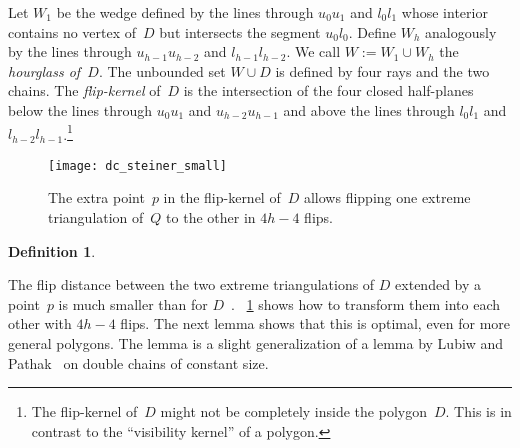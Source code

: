 \documentclass[a4paper,11pt]{article}
\newtheorem{definition}[theorem]{Definition}
\begin{document}
Let $W_1$ be the wedge defined by the lines through $u_0 u_1$ and
$l_0 l_1$ whose interior contains no vertex of~$D$ but intersects the segment $u_0 l_0$.
Define $W_h$ analogously by the lines through $u_{h-1} u_{h-2}$ and $l_{h-1} l_{h-2}$.
We call $W := W_1 \cup W_h$ the \emph{hourglass of~$D$}.
The unbounded set $W \cup D$ is defined by four rays and the two chains.
The \emph{flip-kernel} of~$D$ is the intersection of the four closed half-planes below the lines through $u_0 u_1$ and $u_{h-2} u_{h-1}$ and above the lines through $l_0 l_1$ and $l_{h-2} l_{h-1}$.\footnote{The flip-kernel of~$D$ might not be completely inside the polygon~$D$.
This is in contrast to the ``visibility kernel'' of a polygon.}

\begin{figure}
\centering
\texttt{[image: dc\_steiner\_small]}
\caption{The extra point~$p$ in the flip-kernel of~$D$ allows flipping one extreme triangulation
of~$Q$ to the other in $4h-4$ flips.}
\label{fig_dc_steiner}
\end{figure}

\begin{definition}\label{def_p_d_plus}
\end{definition}

The flip distance between the two extreme
triangulations of $D$ extended by a point~$p$ is much
smaller than for $D$~\cite{problemas}.
\figurename~\ref{fig_dc_steiner} shows how to 
transform them into each other with $4h-4$ flips.
The next lemma shows that this is optimal, even for more general polygons.
The lemma is a slight generalization of a lemma by Lubiw and Pathak~\cite{lubiw} on double chains of constant size.
\end{document}
